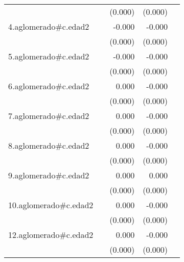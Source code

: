 {\begin{longtable}{l*{4}{D{.}{.}{-1}}}
            &                     &     (0.000)         &     (0.000)         &                     \\
\addlinespace
4.aglomerado#c.edad2&                     &      -0.000         &      -0.000\sym{***}&                     \\
            &                     &     (0.000)         &     (0.000)         &                     \\
\addlinespace
5.aglomerado#c.edad2&                     &      -0.000         &      -0.000\sym{***}&                     \\
            &                     &     (0.000)         &     (0.000)         &                     \\
\addlinespace
6.aglomerado#c.edad2&                     &       0.000         &      -0.000         &                     \\
            &                     &     (0.000)         &     (0.000)         &                     \\
\addlinespace
7.aglomerado#c.edad2&                     &       0.000         &      -0.000         &                     \\
            &                     &     (0.000)         &     (0.000)         &                     \\
\addlinespace
8.aglomerado#c.edad2&                     &       0.000         &      -0.000         &                     \\
            &                     &     (0.000)         &     (0.000)         &                     \\
\addlinespace
9.aglomerado#c.edad2&                     &       0.000         &       0.000         &                     \\
            &                     &     (0.000)         &     (0.000)         &                     \\
\addlinespace
10.aglomerado#c.edad2&                     &       0.000         &      -0.000         &                     \\
            &                     &     (0.000)         &     (0.000)         &                     \\
\addlinespace
12.aglomerado#c.edad2&                     &       0.000         &      -0.000         &                     \\
            &                     &     (0.000)         &     (0.000)         &                     \\

\end{longtable}}

